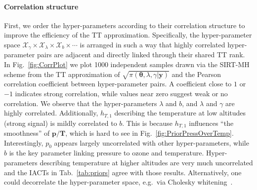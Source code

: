 \paragraph{Correlation structure}
First, we order the hyper-parameters according to their correlation structure to improve the efficiency of the TT approximation. 
Specifically, the hyper-parameter space $\mathcal{X}_{\gamma} \times \mathcal{X}_{\lambda} \times \mathcal{X}_{b} \times \cdots$ is arranged in such a way that highly correlated hyper-parameter pairs are adjacent and directly linked through their shared TT rank.
In Fig.~\ref{fig:CorrPlot} we plot 1000 independent samples drawn via the SIRT-MH scheme from the TT approximation of $\sqrt{\pi( \bm{\theta},\lambda,\gamma  | \bm{y})}$ and the Pearson correlation coefficient between hyper-parameter pairs.
A coefficient close to $1$ or $-1$ indicates strong correlation, while values near zero suggest weak or no correlation.
We observe that the hyper-parameters $\lambda$ and $b$, and $\lambda$ and $\gamma$ are highly correlated.
Additionally, $h_{T,1}$ describing the temperature at low altitudes (strong signal) is mildly correlated to $b$.
This is because $h_{T,1}$ influences ``the smoothness'' of $\bm{p}/\bm{T}$, which is hard to see in Fig.~\ref{fig:PriorPressOverTemp}.
Interestingly, $p_0$ appears largely uncorrelated with other hyper-parameters, while $b$ is the key parameter linking pressure to ozone and temperature.
Hyper-parameters describing temperature at higher altitudes are very much uncorrelated and the IACTs in Tab.~\ref{tab:priors} agree with those results.
Alternatively, one could decorrelate the hyper-parameter space, e.g.~via Cholesky whitening~\cite{KessyWhitening2018}.
\clearpage
